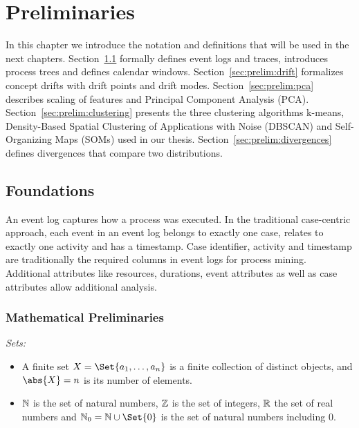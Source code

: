 \chapter{Preliminaries}
\label{chap:prelim}
In this chapter we introduce the notation and definitions that will be used in the next chapters. Section~\ref{sec:prelim:foundations} formally defines event logs and traces, introduces process trees and defines calendar windows. Section~\ref{sec:prelim:drift} formalizes concept drifts with drift points and drift modes. Section~\ref{sec:prelim:pca} describes scaling of features and Principal Component Analysis (PCA). Section~\ref{sec:prelim:clustering} presents the three clustering algorithms k-means, Density-Based Spatial Clustering of Applications with Noise (DBSCAN) and Self-Organizing Maps (SOMs) used in our thesis. Section~\ref{sec:prelim:divergences} defines divergences that compare two distributions.

\section{Foundations}
\label{sec:prelim:foundations}

An event log captures how a process was executed. In the traditional case-centric approach, each event in an event log belongs to exactly one case, relates to exactly one activity and has a timestamp. Case identifier, activity and timestamp are traditionally the required columns in event logs for process mining. Additional attributes like resources, durations, event attributes as well as case attributes allow additional analysis.


\subsection{Mathematical Preliminaries}
\label{sec:prelim:maths}

\noindent\emph{Sets:}
\begin{itemize}[beginpenalty=10000]
	\item A finite set $X = \Set{a_1, \dots, a_n}$ is a finite collection of distinct objects, and $\abs{X} = n$ is its number of elements.
	\item $\mathbb N$ is the set of natural numbers, $\mathbb Z$ is the set of integers, $\mathbb R$ the set of real numbers and $\N_0 = \N \cup \Set{0}$ is the set of natural numbers including $0$.
\end{itemize}

